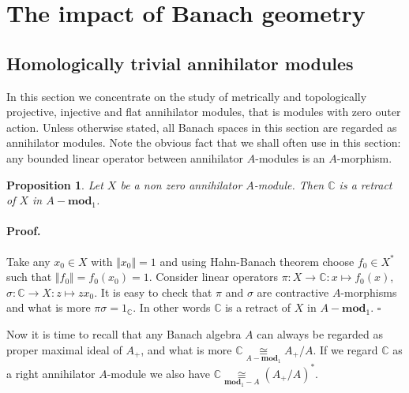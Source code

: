 \documentclass[12pt]{article}
\newcommand{\isom}[1]{\mathop{\mathbin{\cong}}\limits_{#1}}
\newtheorem{proposition}[theorem]{Proposition}
\renewenvironment{proof}{\paragraph{Proof.}}{\hfill$\square$\medskip}
\begin{document}

\section{The impact of Banach geometry}\label{SectionTheImpactOfBanachGeometry}



\subsection{Homologically trivial annihilator
    modules}\label{SubSectionHomoligicallyTrivialAnnihilatorModules}

In this section we concentrate on the study of metrically and topologically
projective, injective and flat annihilator modules, that is modules with zero
outer action. Unless otherwise stated, all Banach spaces in this section are
regarded as annihilator modules. Note the obvious fact that we shall often use
in this section: any bounded linear operator between annihilator $A$-modules is
an $A$-morphism.

\begin{proposition}\label{AnnihCModIsRetAnnihMod} Let $X$ be a non zero
    annihilator $A$-module. Then $\mathbb{C}$ is a retract of $X$ in $A-\mathbf{mod}_1$.
\end{proposition}
\begin{proof} Take any $x_0\in X$ with $\Vert x_0\Vert=1$ and using Hahn-Banach
    theorem choose $f_0\in X^*$ such that $\Vert f_0\Vert=f_0(x_0)=1$. Consider
    linear operators $\pi:X\to \mathbb{C}:x\mapsto f_0(x)$,
    $\sigma:\mathbb{C}\to X:z\mapsto zx_0$. It is easy to check that $\pi$ and
    $\sigma$ are contractive $A$-morphisms and what is more
    $\pi\sigma=1_\mathbb{C}$. In other words $\mathbb{C}$ is a retract of $X$ in
    $A-\mathbf{mod}_1$.
\end{proof}

Now it is time to recall that any Banach algebra $A$ can always be regarded as
proper maximal ideal of $A_+$, and what is more
$\mathbb{C}\isom{A-\mathbf{mod}_1} A_+/A$. If we regard $\mathbb{C}$ as a right
annihilator $A$-module we also have $\mathbb{C}\isom{\mathbf{mod}_1-A}{(A_+/A)}^*$.
\end{document}
